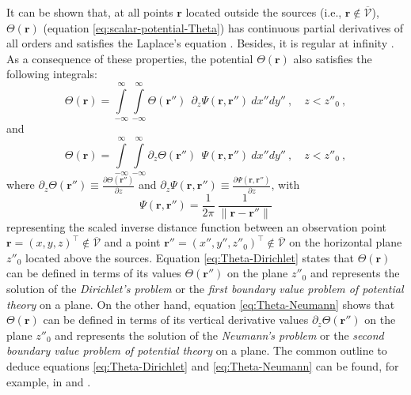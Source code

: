 It can be shown that, at all points $\mathbf{r}$ located outside the sources (i.e., 
$\mathbf{r} \notin \overline{\mathcal{V}}$), $\Theta(\mathbf{r})$ (equation
\ref{eq:scalar-potential-Theta}) has continuous partial derivatives of all orders
and satisfies the Laplace's equation \citep[][ p. 122--124]{kellogg1967}.
Besides, it is regular at infinity \citep[][ p. 217]{kellogg1967}.
As a consequence of these properties, the potential $\Theta(\mathbf{r})$ also satisfies 
the following integrals:
\begin{equation}
\Theta(\mathbf{r}) =  
\int\limits_{-\infty}^{\infty} \int\limits_{-\infty}^{\infty}
\Theta(\mathbf{r}'') \:\: 
\partial_{z} \Psi(\mathbf{r}, \mathbf{r}'') \: dx''dy'' \: , \quad z < z''_{0} \: ,
\label{eq:Theta-Dirichlet}
\end{equation}
and 
\begin{equation}
\Theta(\mathbf{r}) =  
\int\limits_{-\infty}^{\infty} \int\limits_{-\infty}^{\infty}
\partial_{z} \Theta(\mathbf{r}'') \:\: 
\Psi(\mathbf{r}, \mathbf{r}'') \: dx''dy'' \: , \quad z < z''_{0} \: ,
\label{eq:Theta-Neumann}
\end{equation}
where 
$\partial_{z} \Theta(\mathbf{r}'') \equiv \tfrac{\partial \Theta(\mathbf{r}'')}{\partial z}$
and 
$\partial_{z} \Psi(\mathbf{r}, \mathbf{r}'') \equiv \tfrac{\partial
\Psi(\mathbf{r}, \mathbf{r}'')}{\partial z}$, with 
\begin{equation}
\Psi(\mathbf{r}, \mathbf{r}'') = 
\frac{1}{2\pi} \: 
\frac{1}{\| \mathbf{r} - \mathbf{r}'' \|}
\label{eq:Psi}
\end{equation}
representing the scaled inverse distance function between an observation point
$\mathbf{r} = (x, y, z)^{\top} \notin \overline{\mathcal{V}}$ and a point 
$\mathbf{r}'' = (x'', y'', z''_{0})^{\top} \notin \overline{\mathcal{V}}$ on the horizontal
plane $z''_{0}$ located above the sources.
Equation \ref{eq:Theta-Dirichlet} states that $\Theta(\mathbf{r})$ can be defined
in terms of its values $\Theta(\mathbf{r}'')$ on the plane $z''_{0}$ and 
represents the solution of the \textit{Dirichlet’s problem} or the \textit{first boundary
value problem of potential theory} \cite[][ p. 236]{kellogg1967} on a plane.
On the other hand, equation \ref{eq:Theta-Neumann} shows that $\Theta(\mathbf{r})$ can 
be defined in terms of its vertical derivative values $\partial_{z} \Theta(\mathbf{r}'')$ 
on the plane $z''_{0}$ and represents the solution of the 
\textit{Neumann’s problem} or the \textit{second boundary value problem of potential
theory} \cite[][ p. 246]{kellogg1967} on a plane.
The common outline to deduce equations \ref{eq:Theta-Dirichlet} and \ref{eq:Theta-Neumann}
can be found, for example, in \citet{roy1962} and \citet{reis_etal2020}.

